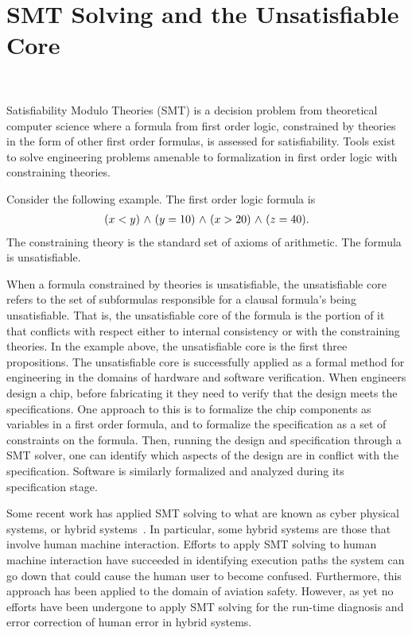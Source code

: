 \section{SMT Solving and the Unsatisfiable Core}~\label{smt}

Satisfiability Modulo Theories (SMT) is a decision problem from theoretical computer science where a formula from first order logic, constrained by theories in the form of other first order formulas, is assessed for satisfiability. Tools exist to solve engineering problems amenable to formalization in first order logic with constraining theories.

Consider the following example. The first order logic formula is
\begin{align*}
(x < y) {\ \wedge \ } 
(y = 10) {\ \wedge \ }
(x > 20) {\ \wedge \ } 
(z = 40).
\end{align*}
The constraining theory is the standard set of axioms of arithmetic. The formula is unsatisfiable.

When a formula constrained by theories is unsatisfiable, the unsatisfiable core refers to the set of subformulas responsible for a clausal formula's being unsatisfiable. That is, the unsatisfiable core of the formula is the portion of it that conflicts with respect either to internal consistency or with the constraining theories. In the example above, the unsatisfiable core is the first three propositions. The unsatisfiable core is successfully applied as a formal method for engineering in the domains of hardware and software verification. When engineers design a chip, before fabricating it they need to verify that the design meets the specifications. One approach to this is to formalize the chip components as variables in a first order formula, and to formalize the specification as a set of constraints on the formula. Then, running the design and specification through a SMT solver, one can identify which aspects of the design are in conflict with the specification. Software is similarly formalized and analyzed during its specification stage.

Some recent work has applied SMT solving to what are known as cyber physical systems, or hybrid systems~\cite{RushbyMC}. In particular, some hybrid systems are those that involve human machine interaction. Efforts to apply SMT solving to human machine interaction have succeeded in identifying execution paths the system can go down that could cause the human user to become confused. Furthermore, this approach has been applied to the domain of aviation safety. However, as yet no efforts have been undergone to apply SMT solving for the run-time diagnosis and error correction of human error in hybrid systems. 

